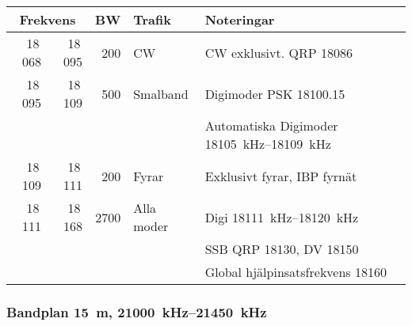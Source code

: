 \begin{tabular}{rrrll}
\multicolumn{2}{c}{\textbf{Frekvens}} & \textbf{BW} & \textbf{Trafik}
        & \textbf{Noteringar} \\ \hline

 18\,068 & 18\,095 & 200  & CW         & CW exklusivt. QRP \num{18086}                             \\ \hline
18\,095  & 18\,109 & 500  & Smalband   & Digimoder PSK \SI{18100,15}{}                             \\
         &         &      &            & Automatiska Digimoder \SIrange{18105}{18109}{\kilo\hertz} \\ \hline
18\,109  & 18\,111 & 200  & Fyrar      & Exklusivt fyrar, IBP fyrnät                               \\ \hline
18\,111  & 18\,168 & 2700 & Alla moder & Digi \SIrange{18111}{18120}{\kilo\hertz}                  \\
         &         &      &            & SSB QRP \num{18130}, DV \num{18150}                       \\
         &         &      &            & Global hjälpinsatsfrekvens \num{18160}                    \\ \hline
\end{tabular}

\subsubsection{Bandplan \SI{15}{\metre}, \SIrange{21000}{21450}{\kilo\hertz}}

